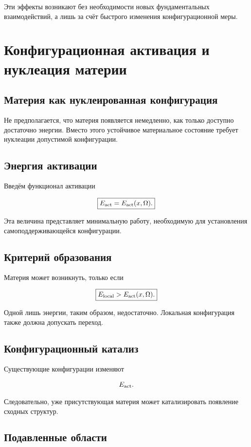 Эти эффекты возникают без необходимости новых фундаментальных взаимодействий, а лишь за счёт быстрого изменения конфигурационной меры.

\chapter{Конфигурационная активация и нуклеация материи}

\section{Материя как нуклеированная конфигурация}

Не предполагается, что материя появляется немедленно, как только доступно достаточно энергии. Вместо этого устойчивое материальное состояние требует нуклеации допустимой конфигурации.

\section{Энергия активации}

Введём функционал активации

\[ \boxed{ E_{\rm act} = E_{\rm act}(x,\Omega). } \]

Эта величина представляет минимальную работу, необходимую для установления самоподдерживающейся конфигурации.

\section{Критерий образования}

Материя может возникнуть, только если

\[ \boxed{ E_{\rm local} > E_{\rm act}(x,\Omega). } \]

Одной лишь энергии, таким образом, недостаточно. Локальная конфигурация также должна допускать переход.

\section{Конфигурационный катализ}

Существующие конфигурации изменяют

\[ E_{\rm act}. \]

Следовательно, уже присутствующая материя может катализировать появление сходных структур.

\section{Подавленные области}

